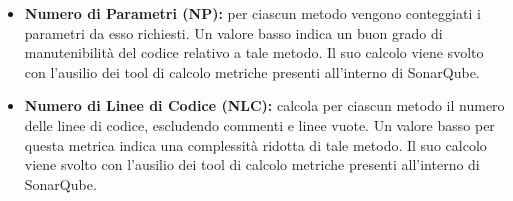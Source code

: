 \begin{itemize}
	\label{metrics:NP}
	\item \textbf{Numero di Parametri (NP): }per ciascun metodo vengono conteggiati i parametri da esso richiesti. Un valore basso indica un buon grado di manutenibilità del codice relativo a tale metodo. Il suo calcolo viene svolto con l'ausilio dei tool di calcolo metriche presenti all'interno di SonarQube.
	\label{metrics:NLC}
	\item \textbf{Numero di Linee di Codice (NLC): }calcola per ciascun metodo il numero delle linee di codice, escludendo commenti e linee vuote. Un valore basso per questa metrica indica una complessità ridotta di tale metodo. Il suo calcolo viene svolto con l'ausilio dei tool di calcolo metriche presenti all'interno di SonarQube.
\end{itemize}